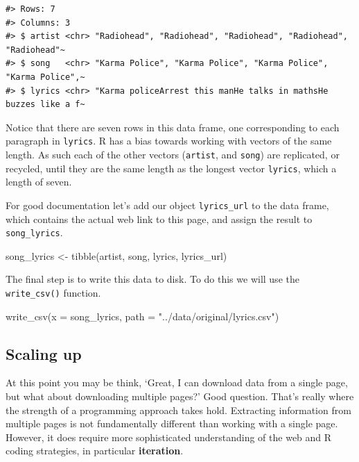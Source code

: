 \documentclass[
  letterpaper,
]{latex/krantz}
\newenvironment{Shaded}{\begin{snugshade}}{\end{snugshade}}
\newcommand{\AttributeTok}[1]{\textcolor[rgb]{0.40,0.45,0.13}{#1}}
\newcommand{\FunctionTok}[1]{\textcolor[rgb]{0.28,0.35,0.67}{#1}}
\newcommand{\NormalTok}[1]{\textcolor[rgb]{0.00,0.23,0.31}{#1}}
\newcommand{\OtherTok}[1]{\textcolor[rgb]{0.00,0.23,0.31}{#1}}
\newcommand{\StringTok}[1]{\textcolor[rgb]{0.13,0.47,0.30}{#1}}
\begin{document}
\begin{verbatim}
#> Rows: 7
#> Columns: 3
#> $ artist <chr> "Radiohead", "Radiohead", "Radiohead", "Radiohead", "Radiohead"~
#> $ song   <chr> "Karma Police", "Karma Police", "Karma Police", "Karma Police",~
#> $ lyrics <chr> "Karma policeArrest this manHe talks in mathsHe buzzes like a f~
\end{verbatim}

Notice that there are seven rows in this data frame, one corresponding
to each paragraph in \texttt{lyrics}. R has a bias towards working with
vectors of the same length. As such each of the other vectors
(\texttt{artist}, and \texttt{song}) are replicated, or recycled, until
they are the same length as the longest vector \texttt{lyrics}, which a
length of seven.

For good documentation let's add our object \texttt{lyrics\_url} to the
data frame, which contains the actual web link to this page, and assign
the result to \texttt{song\_lyrics}.

\begin{Shaded}
\begin{Highlighting}[]
\NormalTok{song\_lyrics }\OtherTok{\textless{}{-}} \FunctionTok{tibble}\NormalTok{(artist, song, lyrics, lyrics\_url)}
\end{Highlighting}
\end{Shaded}

The final step is to write this data to disk. To do this we will use the
\texttt{write\_csv()} function.

\begin{Shaded}
\begin{Highlighting}[]
\FunctionTok{write\_csv}\NormalTok{(}\AttributeTok{x =}\NormalTok{ song\_lyrics, }\AttributeTok{path =} \StringTok{"../data/original/lyrics.csv"}\NormalTok{)}
\end{Highlighting}
\end{Shaded}

\hypertarget{scaling-up}{%
\subsection{Scaling up}\label{scaling-up}}

At this point you may be think, `Great, I can download data from a
single page, but what about downloading multiple pages?' Good question.
That's really where the strength of a programming approach takes hold.
Extracting information from multiple pages is not fundamentally
different than working with a single page. However, it does require more
sophisticated understanding of the web and R coding strategies, in
particular \textbf{iteration}.
\end{document}
